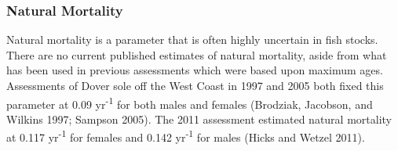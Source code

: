 \documentclass[11pt,
  english,
  a4paper,
]{article}
\begin{document}
\hypertarget{natural-mortality}{%
\subsubsection{Natural Mortality}\label{natural-mortality}}

\leavevmode\tagmcend\tagstructend


Natural mortality is a parameter that is often highly uncertain in fish stocks. There are no current published estimates of natural mortality, aside from what has been used in previous assessments which were based upon maximum ages. Assessments of Dover sole off the West Coast in 1997 and 2005 both fixed this parameter at 0.09 yr\textsuperscript{-1} for both males and females {(Brodziak, Jacobson, and Wilkins 1997; Sampson 2005)\leavevmode\tagmcend\tagstructend}. The 2011 assessment estimated natural mortality at 0.117 yr\textsuperscript{-1} for females and 0.142 yr\textsuperscript{-1} for males {(Hicks and Wetzel 2011)\leavevmode\tagmcend\tagstructend}.

\leavevmode\tagmcend\tagstructend\par

\end{document}
